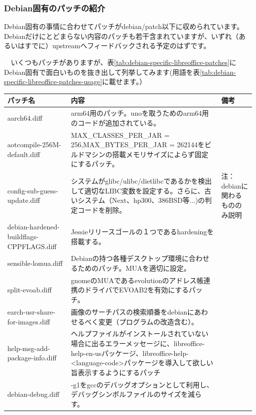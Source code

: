 \documentclass[mingoth,a4paper]{jsarticle}
\begin{document}
\subsubsection{Debian固有のパッチの紹介}

 Debian固有の事情に合わせてパッチがdebian/patch以下に収められています。Debianだけにとどまらない内容のパッチも若干含まれていますが、いずれ（あるいはすでに）upstreamへフィードバックされる予定のはずです。

　いくつもパッチがありますが、表\ref{tab:debian-specific-libreoffice-patches}にDebian固有で面白いものを抜き出して列挙してみます(用語を表\ref{tab:debian-specific-libreoffice-patches-usage}に載せます。）

\begin{table}[ht]
\begin{center}
\small
\begin{tabular}{|l|p{7cm}|p{3cm}|}
\hline
パッチ名 & 内容 & 備考 \\ \hline \hline
aarch64.diff & arm64用のパッチ。unoを取うためのarm64用のコードが追加されている。& \\ \hline
aotcompile-256M-default.diff & MAX\_CLASSES\_PER\_JAR = 256,MAX\_BYTES\_PER\_JAR = 262144をビルドマシンの搭載メモリサイズによらず固定にするパッチ。& \\ \hline
config-sub-guess-update.diff & システムがglibc/ulibc/dietlibcであるかを検出して適切なLIBC変数を設定する。さらに、古いシステム（Next、hp300、386BSD等...)の判定コードを削除。& 注：debianに関わるもののみ説明 \\ \hline
debian-hardened-buildflags-CPPFLAGS.diff & Jessieリリースゴールの１つであるhardeningを搭載する。 & \\ \hline
sensible-lomua.diff & Debianの持つ各種デスクトップ環境に合わせるためのパッチ。MUAを適切に設定。& \\ \hline
split-evoab.diff & gnomeのMUAであるevolutionのアドレス帳連携のドライバでEVOAB2を有効にするパッチ。& \\ \hline
earch-usr-share-for-images.diff & 画像のサーチパスの検索順番をdebianにあわせるべく変更（プログラムの改造含む）。& \\ \hline
help-msg-add-package-info.diff & ヘルプファイルがインストールされていない場合に出るエラーメッセージに、libreoffice-help-en-usパッケージ、libreoffice-help-<language-code>パッケージを導入して欲しい旨表示するようにするパッチ & \\ \hline
debian-debug.diff & -g1をgccのデバッグオプションとして利用し、デバッグシンボルファイルのサイズを減らす。& \\ \hline

\end{tabular}
\end{center}
\end{table}
\end{document}
